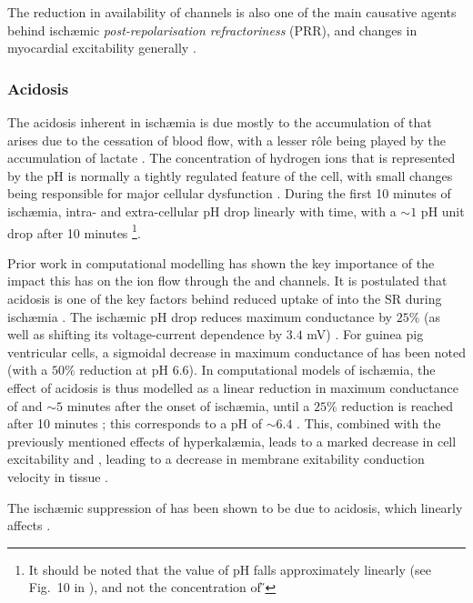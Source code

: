 \documentclass[../thesis-main.tex]{subfiles}
\begin{document}
 The reduction in availability of \ina{} channels is also one of the main causative agents behind isch\ae{}mic \emph{post-repolarisation refractoriness} (PRR), and changes in myocardial excitability generally \citep{Coronel2012}.
 
 \subsubsection{Acidosis}
 \label{subsubsec:acidosis}
 The acidosis inherent in isch\ae{}mia is due mostly to the accumulation of  that arises due to the cessation of blood flow, with a lesser r\^ole being played by the accumulation of lactate \citep{Ichihara1984}. The concentration of hydrogen ions that is represented by the pH is normally a tightly regulated feature of the cell, with small changes being responsible for major cellular dysfunction \citep{Chen1998}. During the first 10 minutes of isch\ae{}mia, intra- and extra-cellular pH drop linearly with time, with a $\sim1$ pH unit drop after 10 minutes \citep{Shaw1997, Neely1975, Mohabir1991}\footnote{It should be noted that the value of pH falls approximately linearly (see Fig.~10 in \citet{Mohabir1991}), and not the concentration of \H{}}.
 
 Prior work in computational modelling has shown the key importance of the impact this has on the ion flow through the \ina{} and \ica{} channels. It is postulated that acidosis is one of the key factors behind reduced uptake of \ca{} into the SR during isch\ae{}mia \citep{Krause1984}. The isch\ae{}mic pH drop reduces \ina{} maximum conductance by $25\%$ (as well as shifting its voltage-current dependence by $3.4$ mV) \citep{Kagiyama1982}. For guinea pig ventricular cells, a sigmoidal decrease in maximum conductance of \ica{} has been noted (with a $50\%$ reduction at pH $6.6$). In computational models of isch\ae{}mia, the effect of acidosis is thus modelled as a linear reduction in maximum conductance of \ina{} and \ica{} $\sim5$ minutes after the onset of isch\ae{}mia, until a $25\%$ reduction is reached after 10 minutes \citep{Trenor2007}; this corresponds to a pH of $\sim6.4$ \citep{Ferrero2003}. This, combined with the previously mentioned effects of hyperkal\ae{}mia, leads to a marked decrease in cell excitability and \dvdt{}, leading to a decrease in membrane exitability conduction velocity in tissue \citep{Shaw1997}.
 
 The isch\ae{}mic suppression of \inak{} \citep{Dhalla1988} has been shown to be due to acidosis, which linearly affects \inak{} \citep{Severi2002}.
 
\end{document}
